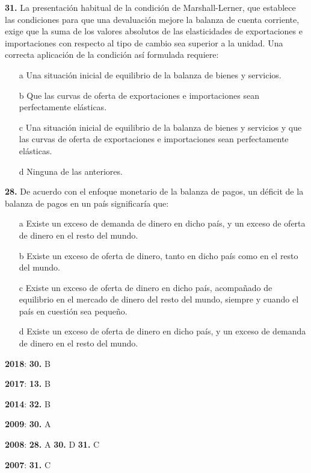 \documentclass{nuevotema}
\begin{document}

\textbf{31.} La presentación habitual de la condición de Marshall-Lerner, que establece las condiciones para que una devaluación mejore la balanza de cuenta corriente, exige que la suma de los valores absolutos de las elasticidades de exportaciones e importaciones con respecto al tipo de cambio sea superior a la unidad. Una correcta aplicación de la condición así formulada requiere:
\begin{itemize}
	\item[a] Una situación inicial de equilibrio de la balanza de bienes y servicios.
	\item[b] Que las curvas de oferta de exportaciones e importaciones sean perfectamente elásticas.
	\item[c] Una situación inicial de equilibrio de la balanza de bienes y servicios y que las curvas de oferta de exportaciones e importaciones sean perfectamente elásticas.
	\item[d] Ninguna de las anteriores.
\end{itemize}


\textbf{28.} De acuerdo con el enfoque monetario de la balanza de pagos, un déficit de la balanza de pagos en un país significaría que:
\begin{itemize}
	\item[a] Existe un exceso de demanda de dinero en dicho país, y un exceso de oferta de dinero en el resto del mundo.
	\item[b] Existe un exceso de oferta de dinero, tanto en dicho país como en el resto del mundo.
	\item[c] Existe un exceso de oferta de dinero en dicho país, acompañado de equilibrio en el mercado de dinero del resto del mundo, siempre y cuando el país en cuestión sea pequeño.
	\item[d] Existe un exceso de oferta de dinero en dicho país, y un exceso de demanda de dinero en el resto del mundo.
\end{itemize}

\notas

\textbf{2018}: \textbf{30.} B

\textbf{2017}: \textbf{13.} B

\textbf{2014}: \textbf{32.} B

\textbf{2009}: \textbf{30.} A

\textbf{2008}: \textbf{28.} A \textbf{30.} D \textbf{31.} C

\textbf{2007}: \textbf{31.} C
\end{document}
